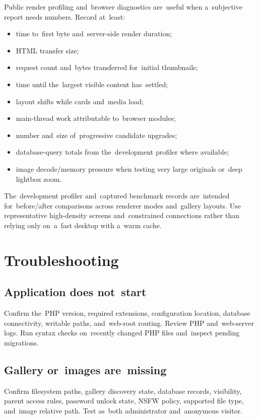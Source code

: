 \documentclass[11pt,a4paper]{article}
\begin{document}
Public render profiling and~browser diagnostics are~useful when a~subjective
report needs numbers. Record at~least:

\begin{itemize}
  \item time to~first byte and~server-side render duration;
  \item HTML transfer size;
  \item request count and~bytes transferred for~initial thumbnails;
  \item time until the~largest visible content has~settled;
  \item layout shifts while cards and~media load;
  \item main-thread work attributable to~browser modules;
  \item number and~size of~progressive candidate upgrades;
  \item database-query totals from the~development profiler where available;
  \item image decode/memory pressure when testing very large originals or~deep
  lightbox zoom.
\end{itemize}

The~development profiler and~captured benchmark records are~intended
for~before/after comparisons across renderer modes and~gallery layouts. Use
representative high-density screens and~constrained connections rather than
relying only on~a~fast desktop with a~warm cache.

\section{Troubleshooting}
\label{sec:troubleshooting}

\subsection{Application does not~start}

Confirm the~PHP version, required extensions, configuration location, database
connectivity, writable paths, and~web-root routing. Review PHP and~web-server
logs. Run syntax checks on~recently changed PHP files and~inspect pending
migrations.

\subsection{Gallery or~images are~missing}

Confirm filesystem paths, gallery discovery state, database records, visibility,
parent access rules, password unlock state, NSFW policy, supported file type,
and~image relative path. Test as~both administrator and~anonymous visitor.
\end{document}
